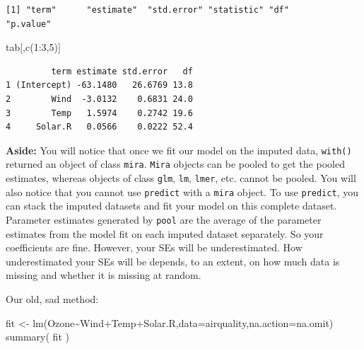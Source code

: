 \documentclass[
  letterpaper,
  DIV=11,
  numbers=noendperiod]{scrreprt}
\newenvironment{Shaded}{\begin{snugshade}}{\end{snugshade}}
\newcommand{\AttributeTok}[1]{\textcolor[rgb]{0.49,0.56,0.16}{#1}}
\newcommand{\DecValTok}[1]{\textcolor[rgb]{0.25,0.63,0.44}{#1}}
\newcommand{\FunctionTok}[1]{\textcolor[rgb]{0.02,0.16,0.49}{#1}}
\newcommand{\NormalTok}[1]{\textcolor[rgb]{0.00,0.44,0.13}{#1}}
\newcommand{\OtherTok}[1]{\textcolor[rgb]{0.00,0.44,0.13}{#1}}
\newcommand{\SpecialCharTok}[1]{\textcolor[rgb]{0.25,0.44,0.63}{#1}}
\begin{document}
\begin{verbatim}
[1] "term"      "estimate"  "std.error" "statistic" "df"        "p.value"  
\end{verbatim}

\begin{Shaded}
\begin{Highlighting}[]
\NormalTok{  tab[,}\FunctionTok{c}\NormalTok{(}\DecValTok{1}\SpecialCharTok{:}\DecValTok{3}\NormalTok{,}\DecValTok{5}\NormalTok{)]}
\end{Highlighting}
\end{Shaded}

\begin{verbatim}
         term estimate std.error   df
1 (Intercept) -63.1480   26.6769 13.8
2        Wind  -3.0132    0.6831 24.0
3        Temp   1.5974    0.2742 19.6
4     Solar.R   0.0566    0.0222 52.4
\end{verbatim}

\textbf{Aside:} You will notice that once we fit our model on the
imputed data, \texttt{with()} returned an object of class \texttt{mira}.
\texttt{Mira} objects can be pooled to get the pooled estimates, whereas
objects of class \texttt{glm}, \texttt{lm}, \texttt{lmer}, etc. cannot
be pooled. You will also notice that you cannot use \texttt{predict}
with a \texttt{mira} object. To use \texttt{predict}, you can stack the
imputed datasets and fit your model on this complete dataset. Parameter
estimates generated by \texttt{pool} are the average of the parameter
estimates from the model fit on each imputed dataset separately. So your
coefficients are fine. However, your SEs will be underestimated. How
underestimated your SEs will be depends, to an extent, on how much data
is missing and whether it is missing at random.

Our old, sad method:

\begin{Shaded}
\begin{Highlighting}[]
\NormalTok{  fit }\OtherTok{\textless{}{-}} \FunctionTok{lm}\NormalTok{(Ozone}\SpecialCharTok{\textasciitilde{}}\NormalTok{Wind}\SpecialCharTok{+}\NormalTok{Temp}\SpecialCharTok{+}\NormalTok{Solar.R,}\AttributeTok{data=}\NormalTok{airquality,}\AttributeTok{na.action=}\NormalTok{na.omit)}
  \FunctionTok{summary}\NormalTok{( fit )}
\end{Highlighting}
\end{Shaded}
\end{document}
